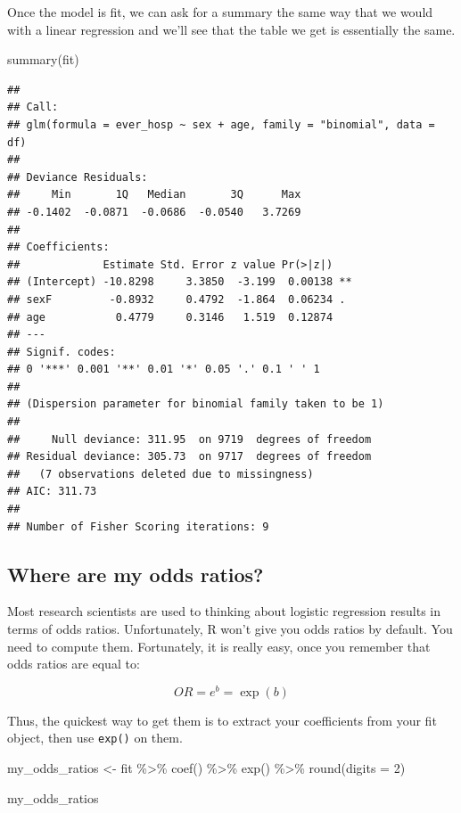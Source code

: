 \documentclass[
]{book}
\newenvironment{Shaded}{\begin{snugshade}}{\end{snugshade}}
\newcommand{\AttributeTok}[1]{\textcolor[rgb]{0.77,0.63,0.00}{#1}}
\newcommand{\DecValTok}[1]{\textcolor[rgb]{0.00,0.00,0.81}{#1}}
\newcommand{\FunctionTok}[1]{\textcolor[rgb]{0.00,0.00,0.00}{#1}}
\newcommand{\NormalTok}[1]{#1}
\newcommand{\OtherTok}[1]{\textcolor[rgb]{0.56,0.35,0.01}{#1}}
\newcommand{\SpecialCharTok}[1]{\textcolor[rgb]{0.00,0.00,0.00}{#1}}
\begin{document}
Once the model is fit, we can ask for a summary the same way that we would with a linear regression and we'll see that the table we get is essentially the same.

\begin{Shaded}
\begin{Highlighting}[]
\FunctionTok{summary}\NormalTok{(fit)}
\end{Highlighting}
\end{Shaded}

\begin{verbatim}
## 
## Call:
## glm(formula = ever_hosp ~ sex + age, family = "binomial", data = df)
## 
## Deviance Residuals: 
##     Min       1Q   Median       3Q      Max  
## -0.1402  -0.0871  -0.0686  -0.0540   3.7269  
## 
## Coefficients:
##             Estimate Std. Error z value Pr(>|z|)   
## (Intercept) -10.8298     3.3850  -3.199  0.00138 **
## sexF         -0.8932     0.4792  -1.864  0.06234 . 
## age           0.4779     0.3146   1.519  0.12874   
## ---
## Signif. codes:  
## 0 '***' 0.001 '**' 0.01 '*' 0.05 '.' 0.1 ' ' 1
## 
## (Dispersion parameter for binomial family taken to be 1)
## 
##     Null deviance: 311.95  on 9719  degrees of freedom
## Residual deviance: 305.73  on 9717  degrees of freedom
##   (7 observations deleted due to missingness)
## AIC: 311.73
## 
## Number of Fisher Scoring iterations: 9
\end{verbatim}

\hypertarget{where-are-my-odds-ratios}{%
\subsection{Where are my odds ratios?}\label{where-are-my-odds-ratios}}

Most research scientists are used to thinking about logistic regression results in terms of odds ratios. Unfortunately, R won't give you odds ratios by default. You need to compute them. Fortunately, it is really easy, once you remember that odds ratios are equal to:

\[
OR = e^b =  \exp(b)
\]

Thus, the quickest way to get them is to extract your coefficients from your fit object, then use \texttt{exp()} on them.

\begin{Shaded}
\begin{Highlighting}[]
\NormalTok{my\_odds\_ratios }\OtherTok{\textless{}{-}}\NormalTok{ fit }\SpecialCharTok{\%\textgreater{}\%} 
  \FunctionTok{coef}\NormalTok{() }\SpecialCharTok{\%\textgreater{}\%} 
  \FunctionTok{exp}\NormalTok{() }\SpecialCharTok{\%\textgreater{}\%} 
  \FunctionTok{round}\NormalTok{(}\AttributeTok{digits =} \DecValTok{2}\NormalTok{)}

\NormalTok{my\_odds\_ratios}
\end{Highlighting}
\end{Shaded}
\end{document}
